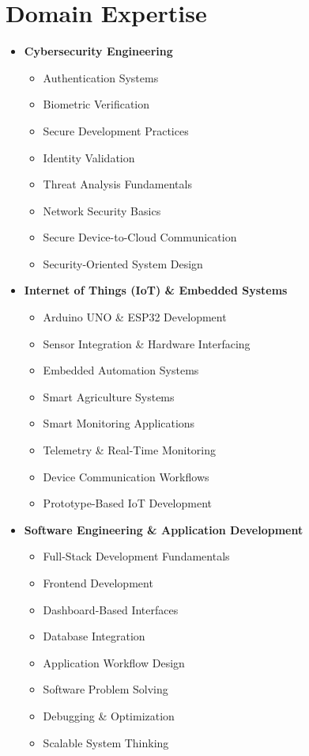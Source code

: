 \documentclass[a4paper,11pt]{article}
\begin{document}

\section{Domain Expertise}

\begin{itemize}[leftmargin=0.15in]

\item \textbf{Cybersecurity Engineering}
\begin{itemize}
    \item Authentication Systems
    \item Biometric Verification
    \item Secure Development Practices
    \item Identity Validation
    \item Threat Analysis Fundamentals
    \item Network Security Basics
    \item Secure Device-to-Cloud Communication
    \item Security-Oriented System Design
\end{itemize}

\item \textbf{Internet of Things (IoT) \& Embedded Systems}
\begin{itemize}
    \item Arduino UNO \& ESP32 Development
    \item Sensor Integration \& Hardware Interfacing
    \item Embedded Automation Systems
    \item Smart Agriculture Systems
    \item Smart Monitoring Applications
    \item Telemetry \& Real-Time Monitoring
    \item Device Communication Workflows
    \item Prototype-Based IoT Development
\end{itemize}

\item \textbf{Software Engineering \& Application Development}
\begin{itemize}
    \item Full-Stack Development Fundamentals
    \item Frontend Development
    \item Dashboard-Based Interfaces
    \item Database Integration
    \item Application Workflow Design
    \item Software Problem Solving
    \item Debugging \& Optimization
    \item Scalable System Thinking
\end{itemize}


\end{itemize}
\end{document}
